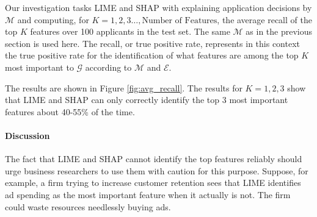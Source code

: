 \documentclass[11pt]{article}    %
\begin{document}
                        Our investigation tasks LIME and SHAP with explaining application decisions by $\mathcal{M}$ and computing, for $K=1,2,3\ldots,\text{Number of Features}$,  the average recall of the top $K$ features over 100 applicants in the test set. The same $\mathcal{M}$ as in the previous section is used here. The recall, or true positive rate, represents in this context the true positive rate for the identification of what features are among the top $K$ most important to $\mathcal{G}$ according to $\mathcal{M}$ and $\mathcal{E}$. 
                        
                        The results are shown in Figure \ref{fig:avg_recall}. The results for $K=1,2,3$ show that LIME and SHAP can only correctly identify the top 3 most important features about 40-55\% of the time. %

                        \paragraph{Discussion}
                        The fact that LIME and SHAP cannot identify the top  features reliably should urge business researchers to use them with caution for this purpose. Suppose, for example, a firm trying to increase customer retention sees that LIME identifies ad spending as the most important feature when it actually is not. The firm could waste resources needlessly buying ads.

\end{document}

